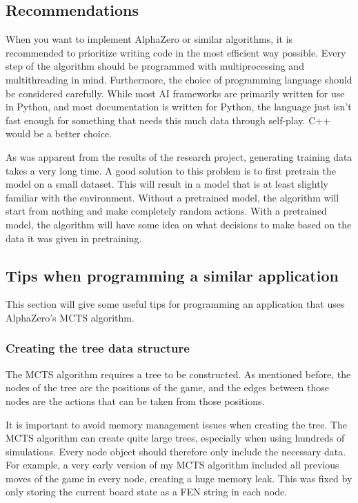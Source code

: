 \documentclass{article}
\begin{document}
\subsection{Recommendations}

When you want to implement AlphaZero or similar algorithms, it is recommended to
prioritize writing code in the most efficient way possible. Every step of the algorithm
should be programmed with multiprocessing and multithreading in mind. Furthermore,
the choice of programming language should be considered carefully. While most AI 
frameworks are primarily written for use in Python, and most documentation is written
for Python, the language just isn't fast enough for something that needs this much data through self-play. 
C++ would be a better choice.

As was apparent from the results of the research project, generating training data 
takes a very long time. A good solution to this problem is to first pretrain the model
on a small dataset. This will result in a model that is at least slightly familiar 
with the environment. Without a pretrained model, the algorithm will start from nothing
and make completely random actions. With a pretrained model, the algorithm will have some 
idea on what decisions to make based on the data it was given in pretraining.


\subsection{Tips when programming a similar application}

This section will give some useful tips for programming an application that uses
AlphaZero's MCTS algorithm. 

\subsubsection{Creating the tree data structure}

The MCTS algorithm requires a tree to be constructed. As mentioned before, the nodes of the tree
are the positions of the game, and the edges between those nodes are the actions that can be taken
from those positions. 

It is important to avoid memory management issues when creating the tree. The MCTS algorithm 
can create quite large trees, especially when using hundreds of simulations. Every node object
should therefore only include the necessary data. For example, a very early version of my MCTS algorithm 
included all previous moves of the game in every node, creating a huge memory leak. This was fixed
by only storing the current board state as a FEN string in each node.
\end{document}
